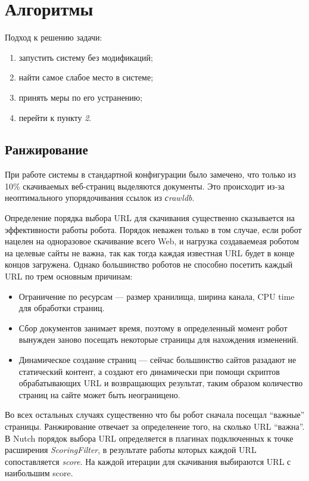 \chapter{Алгоритмы}
Подход к решению задачи:
\begin{enumerate}
 \item запустить систему без модификаций;
 \item найти самое слабое место в системе;
 \item принять меры по его устранению;
 \item перейти к пункту \textit{2}.
\end{enumerate}
\section{Ранжирование}
При работе системы в стандартной конфигурации было замечено, что только из 10\% скачиваемых веб-страниц выделяются документы. Это происходит из-за неоптимального упорядочивания ссылок из \textit{сrawldb}.

Определение порядка выбора URL для скачивания существенно сказывается на эффективности работы робота.\cite{crawl}\cite{focused}\cite{opic} Порядок неважен только в том случае, если робот нацелен на одноразовое скачивание всего Web, и нагрузка создаваемеая роботом на целевые сайты не важна, так как тогда каждая известная URL будет в конце концов загружена. Однако большинство роботов не способно посетить каждый URL по трем основным причинам:
\begin{itemize}
 \item Ограничение по ресурсам --- размер хранилища, ширина канала, CPU time для обработки страниц.
 \item Сбор документов занимает время, поэтому в определенный момент робот вынужден заново посещать некоторые страницы для нахождения изменений.
 \item Динамическое создание страниц --- сейчас большинство сайтов разадают не статический контент, а создают его динамически при помощи скриптов обрабатывающих URL и возвращающих результат, таким образом количество страниц на сайте может быть неограницено.
\end{itemize}

Во всех остальных случаях существенно что бы робот сначала посещал ``важные'' страницы. Ранжирование отвечает за определенеие того, на сколько URL ``важна''.
В Nutch порядок выбора URL определяется в плагинах подключенных к точке расширения \textit{ScoringFilter}, в результате работы которых каждой URL сопоставляется \textit{score}. На каждой итерации для скачивания выбираются URL с наибольшим score.

